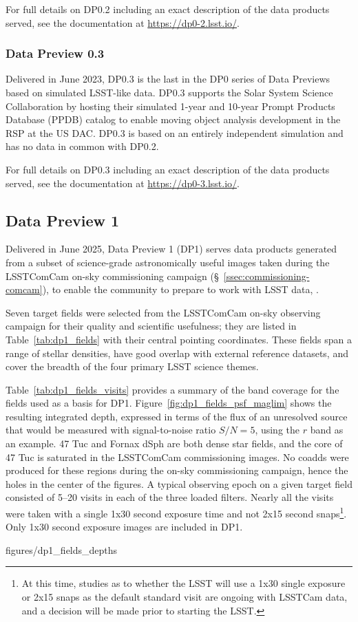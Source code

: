 For full details on DP0.2 including an exact description of the data products served, see the documentation at \url{https://dp0-2.lsst.io/}.

\subsubsection{Data Preview 0.3}
\label{sec:dp03}

Delivered in June  2023, DP0.3 is the last in the DP0 series of Data Previews based on simulated LSST-like data.
DP0.3 supports the Solar System Science Collaboration by hosting their simulated 1-year and 10-year Prompt Products Database (PPDB) catalog to enable moving object analysis development in the RSP at the US DAC.
DP0.3 is based on an entirely independent simulation and has no data in common with DP0.2.

For full details on DP0.3 including an exact description of the data products served, see the documentation at \url{https://dp0-3.lsst.io/}.

\subsection{Data Preview 1}
\label{ssec:dp1}

Delivered in June 2025, Data Preview 1 (DP1) serves data products generated from a subset of science-grade astronomically useful images  taken  during  the LSSTComCam on-sky commissioning campaign (\S~\ref{ssec:commissioning-comcam}), to enable the community to prepare to work with LSST data, \citep[][]{10.71929/rubin/2570308}.

Seven target fields were selected from the LSSTComCam on-sky observing campaign for their quality and scientific usefulness; they are listed in Table~\ref{tab:dp1_fields} with their central pointing coordinates.
These fields span a range of stellar densities, have good overlap with external reference datasets, and cover the breadth of the four primary LSST science themes.


Table~\ref{tab:dp1_fields_visits} provides a summary of the band coverage for the  fields  used as a basis for DP1.
Figure~\ref{fig:dp1_fields_psf_maglim} shows the resulting integrated depth, expressed in terms of the flux of an unresolved source that would be measured with signal-to-noise ratio $S/N = 5$, using the $r$ band as an example.
47 Tuc and Fornax dSph are both dense star fields, and the core of 47 Tuc is saturated in the LSSTComCam commissioning images.
No coadds were produced for these regions during the on-sky commissioning campaign, hence the holes in the center of the figures.
A typical observing epoch on a given target field consisted of 5--20 visits in each of the three loaded filters.
Nearly all the visits  were taken with a single 1x30 second exposure time and not  2x15 second snaps\footnote{At this time, studies as to whether the LSST will use a 1x30 single exposure or 2x15 snaps as the default standard visit are ongoing with LSSTCam data, and a decision will be made prior to starting the LSST. }.
Only 1x30 second exposure images are included in DP1.

 {figures/dp1_fields_depths}

